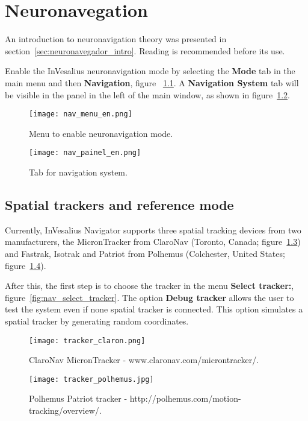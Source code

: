 \chapter{Neuronavegation}
\label{sec:neuronavegador}

An introduction to neuronavigation theory was presented in section~\ref{sec:neuronavegador_intro}. Reading is recommended before its use.

Enable the InVesalius neuronavigation mode by selecting the \textbf{Mode} tab in the main menu and
then \textbf{Navigation}, figure ~\ref{fig:nav_menu_en}. A \textbf{Navigation System} tab will be visible in the
panel in the left of the main window, as shown in figure~\ref{fig:nav_painel_en}.

\begin{figure}[!htb]
\centering
\texttt{[image: nav\_menu\_en.png]}
\caption{Menu to enable neuronavigation mode.}
\label{fig:nav_menu_en}
\end{figure}

\begin{figure}[!htb]
\centering
\texttt{[image: nav\_painel\_en.png]}
\caption{Tab for navigation system.}
\label{fig:nav_painel_en}
\end{figure}

\section{Spatial trackers and reference mode}

Currently, InVesalius Navigator supports three spatial tracking devices from two manufacturers, the MicronTracker
from ClaroNav (Toronto, Canada; figure~\ref{fig:tracker_claron}) and Fastrak, Isotrak and Patriot
from Polhemus (Colchester, United States; figure~\ref{fig:tracker_polhemus}).

After this, the first step is to choose the tracker in the menu \textbf{Select tracker:}, figure~\ref{fig:nav_select_tracker}.
The option \textbf{Debug tracker} allows the user to test the system even if none spatial tracker is connected.
This option simulates a spatial tracker by generating random coordinates.

\begin{figure}[!htb]
\centering
\texttt{[image: tracker\_claron.png]}
\caption{ClaroNav MicronTracker - www.claronav.com/microntracker/.}
\label{fig:tracker_claron}
\end{figure}

\begin{figure}[!htb]
\centering
\texttt{[image: tracker\_polhemus.jpg]}
\caption{Polhemus Patriot tracker - http://polhemus.com/motion-tracking/overview/.}
\label{fig:tracker_polhemus}
\end{figure}

